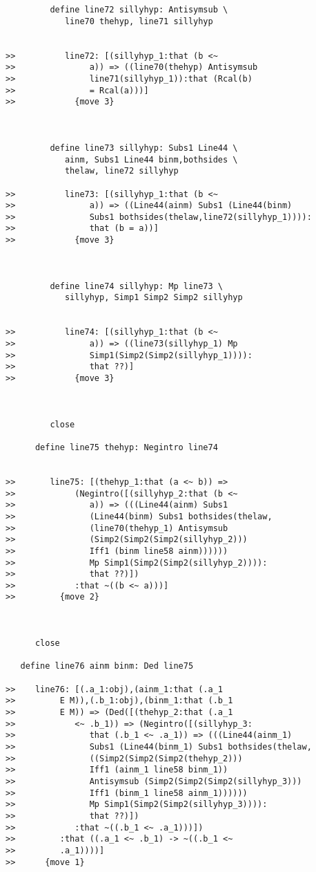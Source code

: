 \documentclass[12pt]{article}
\begin{document}
\begin{verbatim}
         define line72 sillyhyp: Antisymsub \
            line70 thehyp, line71 sillyhyp


>>          line72: [(sillyhyp_1:that (b <~
>>               a)) => ((line70(thehyp) Antisymsub
>>               line71(sillyhyp_1)):that (Rcal(b)
>>               = Rcal(a)))]
>>            {move 3}



         define line73 sillyhyp: Subs1 Line44 \
            ainm, Subs1 Line44 binm,bothsides \
            thelaw, line72 sillyhyp

>>          line73: [(sillyhyp_1:that (b <~
>>               a)) => ((Line44(ainm) Subs1 (Line44(binm)
>>               Subs1 bothsides(thelaw,line72(sillyhyp_1)))):
>>               that (b = a))]
>>            {move 3}



         define line74 sillyhyp: Mp line73 \
            sillyhyp, Simp1 Simp2 Simp2 sillyhyp


>>          line74: [(sillyhyp_1:that (b <~
>>               a)) => ((line73(sillyhyp_1) Mp
>>               Simp1(Simp2(Simp2(sillyhyp_1)))):
>>               that ??)]
>>            {move 3}



         close

      define line75 thehyp: Negintro line74


>>       line75: [(thehyp_1:that (a <~ b)) =>
>>            (Negintro([(sillyhyp_2:that (b <~
>>               a)) => (((Line44(ainm) Subs1
>>               (Line44(binm) Subs1 bothsides(thelaw,
>>               (line70(thehyp_1) Antisymsub
>>               (Simp2(Simp2(Simp2(sillyhyp_2)))
>>               Iff1 (binm line58 ainm))))))
>>               Mp Simp1(Simp2(Simp2(sillyhyp_2)))):
>>               that ??)])
>>            :that ~((b <~ a)))]
>>         {move 2}



      close

   define line76 ainm binm: Ded line75

>>    line76: [(.a_1:obj),(ainm_1:that (.a_1
>>         E M)),(.b_1:obj),(binm_1:that (.b_1
>>         E M)) => (Ded([(thehyp_2:that (.a_1
>>            <~ .b_1)) => (Negintro([(sillyhyp_3:
>>               that (.b_1 <~ .a_1)) => (((Line44(ainm_1)
>>               Subs1 (Line44(binm_1) Subs1 bothsides(thelaw,
>>               ((Simp2(Simp2(Simp2(thehyp_2)))
>>               Iff1 (ainm_1 line58 binm_1))
>>               Antisymsub (Simp2(Simp2(Simp2(sillyhyp_3)))
>>               Iff1 (binm_1 line58 ainm_1))))))
>>               Mp Simp1(Simp2(Simp2(sillyhyp_3)))):
>>               that ??)])
>>            :that ~((.b_1 <~ .a_1)))])
>>         :that ((.a_1 <~ .b_1) -> ~((.b_1 <~
>>         .a_1))))]
>>      {move 1}




\end{verbatim}
\end{document}
